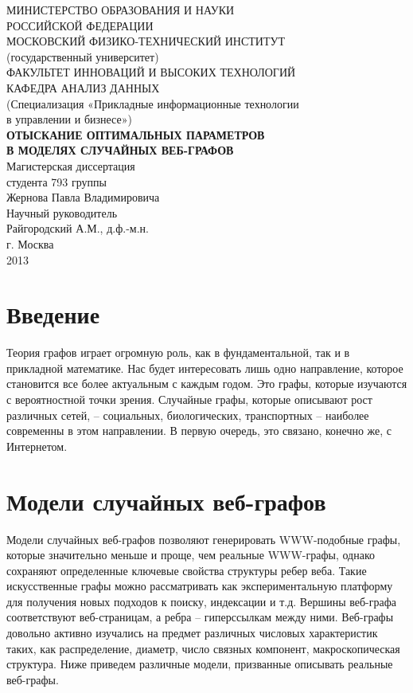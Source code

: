 \documentclass[14pt]{extreport}
\begin{document}

\begin{center}
МИНИСТЕРСТВО ОБРАЗОВАНИЯ И НАУКИ\\ РОССИЙСКОЙ ФЕДЕРАЦИИ\\[0.5cm]

МОСКОВСКИЙ ФИЗИКО-ТЕХНИЧЕСКИЙ ИНСТИТУТ\\
(государственный университет)\\[0.5cm]

ФАКУЛЬТЕТ ИННОВАЦИЙ И ВЫСОКИХ ТЕХНОЛОГИЙ\\
КАФЕДРА АНАЛИЗ ДАННЫХ\\[0.5cm]

(Специализация «Прикладные информационные технологии\\
в управлении и бизнесе»)\\[1.5cm]

{\bf ОТЫСКАНИЕ ОПТИМАЛЬНЫХ ПАРАМЕТРОВ}\\
{\bf В МОДЕЛЯХ СЛУЧАЙНЫХ ВЕБ-ГРАФОВ}\\[1.5cm]

Магистерская диссертация\\
студента 793 группы\\
Жернова Павла Владимировича\\[1.5cm]

Научный руководитель\\
Райгородский А.М., д.ф.-м.н.\\[3cm]


г. Москва\\
2013
\end{center}
\newpage
{} 
\setcounter{page}{2}
\tableofcontents
\newpage

\chapter{Введение}
Теория графов играет огромную роль, как в фундаментальной, так и в прикладной математике. Нас будет интересовать лишь одно направление, которое становится все более актуальным с каждым годом. Это графы, которые изучаются с вероятностной точки зрения. Случайные графы, которые описывают рост различных сетей, – социальных, биологических, транспортных – наиболее современны в этом направлении. В первую очередь, это связано, конечно же, с Интернетом.

\chapter{Модели случайных веб-графов}
Модели случайных веб-графов позволяют генерировать WWW-подобные графы, которые значительно меньше и проще, чем реальные WWW-графы, однако сохраняют определенные ключевые свойства структуры ребер веба. Такие искусственные графы можно рассматривать как экспериментальную платформу для получения новых подходов к поиску, индексации и т.д.
Вершины веб-графа соответствуют веб-страницам, а ребра – гиперссылкам между ними. Веб-графы довольно активно изучались на предмет различных числовых характеристик таких, как распределение, диаметр, число связных компонент, макроскопическая структура. Ниже приведем различные модели, призванные описывать реальные веб-графы.
\end{document}
